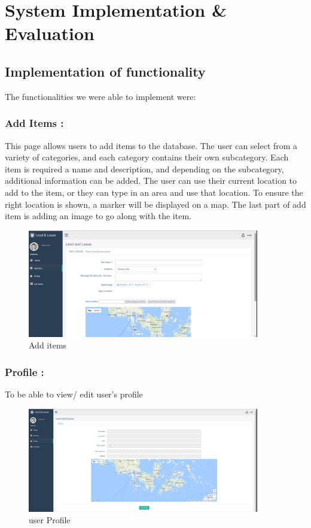 \documentclass[a4paper]{article}
\begin{document}
\section{System Implementation \& Evaluation}
\subsection{Implementation of functionality}
The functionalities we were able to implement were: 
\subsubsection{Add Items :} This page allows users to add items to the database. The user can select from a variety of categories, and each category contains their own subcategory. Each item is required a name and description, and depending on the subcategory, additional information can be added. The user can use their current location to add to the item, or they can type in an area and use that location. To ensure the right location is shown, a marker will be displayed on a map. The last part of add item is adding an image to go along with the item.
\begin{figure}[H] 
  \centering
  \includegraphics[width=0.9\textwidth]{addItems.PNG}\hfill
  \caption{Add items}\label{additems}
\end{figure}

\subsubsection{Profile :} To be able to view/ edit user's profile
\begin{figure}[H] 
  \centering
  \includegraphics[width=0.9\textwidth]{profile.PNG}\hfill
  \caption{user Profile}\label{profile}
\end{figure}
\end{document}
